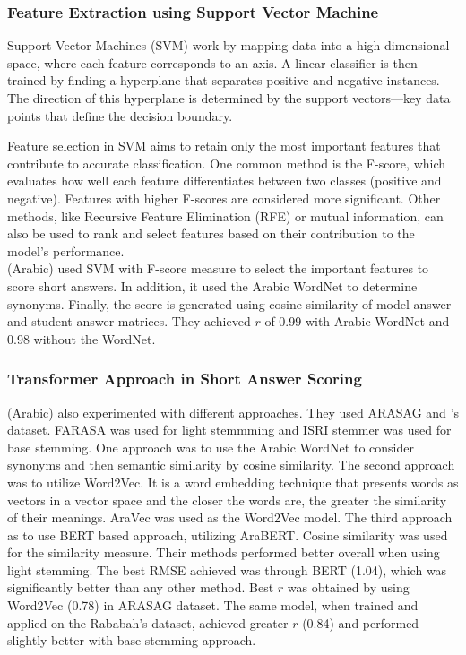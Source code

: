 \documentclass{article}
\begin{document}
	\subsubsection*{Feature Extraction using Support Vector Machine}
	Support Vector Machines (SVM) work by mapping data into a high-dimensional space, where each feature corresponds to an axis. A linear classifier is then trained by finding a hyperplane that separates positive and negative instances. The direction of this hyperplane is determined by the support vectors—key data points that define the decision boundary.
	
	Feature selection in SVM aims to retain only the most important features that contribute to accurate classification. One common method is the F-score, which evaluates how well each feature differentiates between two classes (positive and negative). Features with higher F-scores are considered more significant. Other methods, like Recursive Feature Elimination (RFE) or mutual information, can also be used to rank and select features based on their contribution to the model's performance. \\ 
	
	\textbf{\textcite{4_abdeljaber2021wordnet}} (Arabic) used SVM with F-score measure to select the important features to score short answers. In addition, it used the Arabic WordNet to determine synonyms. Finally, the score is generated using cosine similarity of model answer and student answer matrices. They achieved $r$ of 0.99 with Arabic WordNet and 0.98 without the WordNet.
	
	\subsubsection*{Transformer Approach in Short Answer Scoring}
	\textbf{\textcite{22_meccawy2023mining}} (Arabic) also experimented with different approaches. They used ARASAG and \textcite{16_rababah2017short}'s dataset. FARASA was used for light stemmming and ISRI stemmer was used for base stemming. One approach was to use the Arabic WordNet to consider synonyms and then semantic similarity by cosine similarity. The second approach was to utilize Word2Vec. It is a word embedding technique that presents words as vectors in a vector space and the closer the words are, the greater the similarity of their meanings. AraVec was used as the Word2Vec model. The third approach as to use BERT based approach, utilizing AraBERT. Cosine similarity was used for the similarity measure. Their methods performed better overall when using light stemming. The best RMSE achieved was through BERT (1.04), which was significantly better than any other method. Best $r$ was obtained by using Word2Vec (0.78) in ARASAG dataset. The same model, when trained and applied on the Rababah's dataset, achieved greater $r$ (0.84) and performed slightly better with base stemming approach. \\
	
\end{document}
